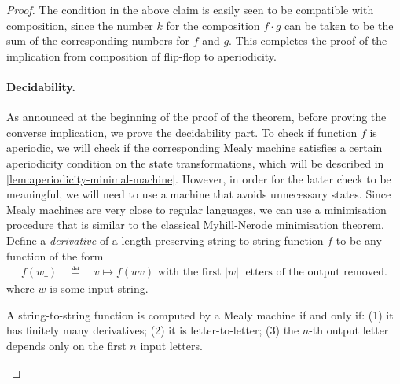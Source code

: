 \begin{proof}
The condition in the above claim is easily seen to be compatible with composition, since the number $k$ for the composition $f \cdot g$ can be taken to be the sum of the corresponding numbers for $f$ and $g$. This completes the proof of the implication from composition of flip-flop to aperiodicity.



    \paragraph*{Decidability.} As announced at the beginning of the proof of the theorem, before proving the converse implication, we  prove the decidability part. To check if function $f$ is aperiodic, we will check if the corresponding Mealy machine satisfies a certain aperiodicity condition on the state transformations, which will be described in \cref{lem:aperiodicity-minimal-machine}.  However, in order for the latter check to be meaningful, we will need to use a machine that avoids unnecessary states.  
    Since Mealy machines are very close to regular languages, we can use a minimisation procedure that is similar to the classical Myhill-Nerode minimisation theorem. 
    Define a \emph{derivative} of  a length preserving string-to-string function $f$ to be  any function of the form 
    \begin{align*}
    f(w\_)  \quad \eqdef \quad  v \mapsto f(wv) \text{ with the first $|w|$ letters of the output removed.}
    \end{align*}
    where $w$ is some input string. 
    
    \begin{lemma}\label{lemma:derivatives}
        A string-to-string function is computed by a Mealy machine if and only if: (1) it has finitely many derivatives; (2)  it is letter-to-letter; (3) the $n$-th output letter depends only on the first $n$ input letters.
    \end{lemma}


\end{proof}
